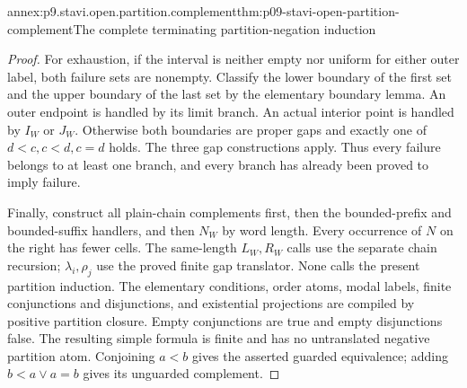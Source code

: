 \begin{annexitem}{annex:p9.stavi.open.partition.complement}{thm:p09-stavi-open-partition-complement}{The complete terminating partition-negation induction}
\begin{proof}
For exhaustion, if the
interval is neither empty
nor uniform for either
outer label, both failure
sets are nonempty. Classify
the lower boundary of the
first set and the upper
boundary of the last set
by the elementary boundary
lemma. An outer endpoint
is handled by its limit
branch. An actual interior
point is handled by
\(I_W\) or \(J_W\).
Otherwise both boundaries
are proper gaps and exactly
one of \(d<c,c<d,c=d\)
holds. The three gap
constructions apply. Thus
every failure belongs
to at least one branch,
and every branch has
already been proved to
imply failure.

Finally, construct all
plain-chain complements first,
then the bounded-prefix and
bounded-suffix handlers, and
then \(N_W\) by word length.
Every occurrence of \(N\)
on the right has fewer
cells. The same-length
\(L_W,R_W\) calls use
the separate chain recursion;
\(\lambda_i,\rho_j\) use
the proved finite gap
translator. None calls
the present partition
induction. The elementary
conditions, order atoms,
modal labels, finite
conjunctions and disjunctions,
and existential projections
are compiled by positive
partition closure. Empty
conjunctions are true and
empty disjunctions false.
The resulting simple formula
is finite and has no
untranslated negative
partition atom. Conjoining
\(a<b\) gives the asserted
guarded equivalence; adding
\(b<a\lor a=b\) gives its
unguarded complement.
\end{proof}
\end{annexitem}

